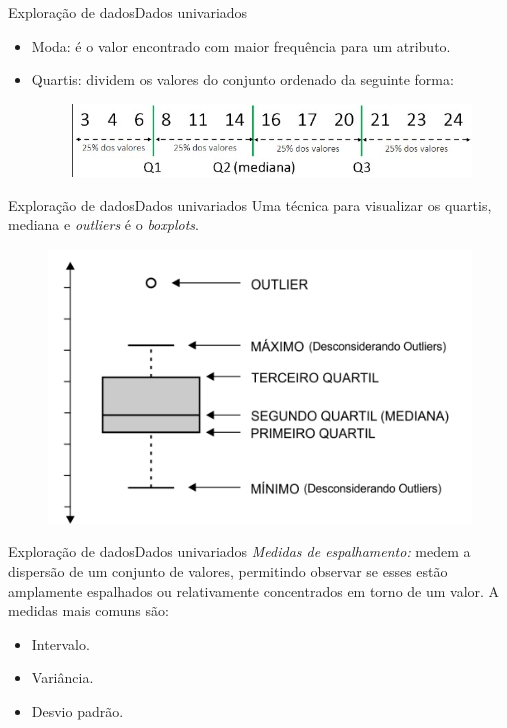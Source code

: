 \documentclass[t]{beamer}
\begin{document}
\begin{ftst}{Exploração de dados}{Dados univariados}

\vone
\begin{itemize}
    \item Moda: é o valor encontrado com maior frequência para um atributo.
    \item Quartis: dividem os valores do conjunto ordenado da seguinte forma:
    \vone
    \begin{figure}
        \centering
        \includegraphics[scale=0.6]{Figuras/slide01_04.jpg}
    \end{figure}
\end{itemize}


\end{ftst}


\begin{ftst}{Exploração de dados}{Dados univariados}
Uma técnica para visualizar os quartis, mediana e \textit{outliers} é o \textit{boxplots}.
\vone
\begin{figure}
    \centering
    \includegraphics[scale=0.2]{Figuras/slide01_05.png}

\end{figure}


\end{ftst}


\begin{ftst}{Exploração de dados}{Dados univariados}
\textit{Medidas de espalhamento:} medem a dispersão de um conjunto de valores, permitindo observar se esses estão amplamente espalhados ou relativamente concentrados em torno de um valor. 
\vone
A medidas mais comuns são:
\begin{itemize}
    \item Intervalo.
    \item Variância.
    \item Desvio padrão.
\end{itemize}

\end{ftst}
\end{document}
